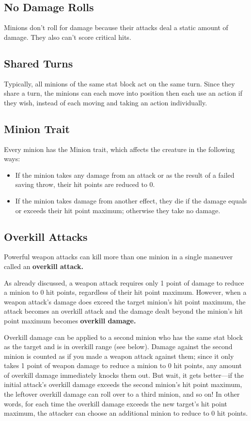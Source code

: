 \documentclass[10pt,a4paper,twoside,bg=print,twocolumn,openany,nodeprecatedcode]{dndbook}
\begin{document}
\subsection{No Damage Rolls}
Minions don't roll for damage because their attacks deal a static amount of damage. They also can't score critical hits.

\subsection{Shared Turns}
Typically, all minions of the same stat block act on the same turn. Since they share a turn, the minions can each move into position then each use an action if they wish, instead of each moving and taking an action individually.

\subsection{Minion Trait}
Every minion has the Minion trait, which affects the creature in the following ways:


\begin{itemize}
\item If the minion takes any damage from an attack or as the result of a failed saving throw, their hit points are reduced to 0.
\item If the minion takes damage from another effect, they die if the damage equals or exceeds their hit point maximum; otherwise they take no damage.
\end{itemize}

\subsection{Overkill Attacks}
Powerful weapon attacks can kill more than one minion in a single maneuver called an \textbf{overkill attack.}

As already discussed, a weapon attack requires only 1 point of damage to reduce a minion to 0 hit points, regardless of their hit point maximum. However, when a weapon attack's damage does exceed the target minion's hit point maximum, the attack becomes an overkill attack and the damage dealt beyond the minion's hit point maximum becomes \textbf{overkill damage.}

Overkill damage can be applied to a second minion who has the same stat block as the target and is in overkill range (see below). Damage against the second minion is counted as if you made a weapon attack against them; since it only takes 1 point of weapon damage to reduce a minion to 0 hit points, any amount of overkill damage immediately knocks them out. But wait, it gets better—if the initial attack's overkill damage exceeds the second minion's hit point maximum, the leftover overkill damage can roll over to a third minion, and so on! In other words, for each time the overkill damage exceeds the new target's hit point maximum, the attacker can choose an additional minion to reduce to 0 hit points.
\end{document}
